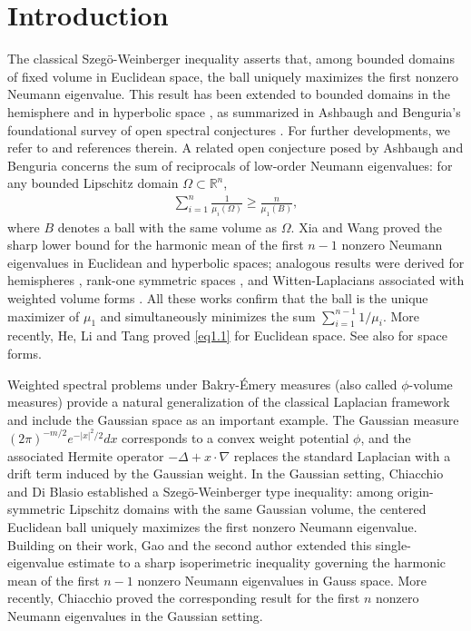 \documentclass[11pt,leqno]{amsart}
\numberwithin{equation}{section}
\begin{document}
\section{Introduction}
The classical Szeg\"o-Weinberger inequality \cite{Sz54, Wei56} asserts that, among bounded domains of fixed volume in Euclidean space, the ball uniquely maximizes the first nonzero Neumann eigenvalue. This result has been extended to bounded domains in the hemisphere and in hyperbolic space \cite{AB95}, as summarized in Ashbaugh and Benguria’s foundational survey of open spectral conjectures \cite{As99}. For further  developments, we refer to \cite{AS96, BCB16,  LL23, Wang19} and references therein. A  related open conjecture posed by Ashbaugh and Benguria \cite{AB93} concerns the sum of reciprocals of low-order Neumann eigenvalues: for any bounded Lipschitz domain $\Omega\subset\mathbb{R}^n$,
\begin{align}\label{eq1.1}
\sum_{i=1}^n \frac{1}{\mu_i(\Omega)} \ge \frac{n}{\mu_1(B)},
\end{align}
where $B$ denotes a ball with the same volume as $\Omega$.
Xia and Wang \cite{XW23}  proved the sharp lower bound for the harmonic mean of the first $n-1$ nonzero Neumann eigenvalues in Euclidean and hyperbolic spaces; analogous results were derived for hemispheres \cite{BBC20}, rank-one symmetric spaces \cite{MW24}, and Witten-Laplacians associated with weighted volume forms \cite{CM24}. All these works confirm that the ball is the unique maximizer of $\mu_1$ and simultaneously minimizes the sum $\sum_{i=1}^{n-1}1/\mu_i$. More recently, He, Li and Tang \cite{HLT26} proved \eqref{eq1.1} for Euclidean space. See also \cite{YZ26} for space forms. 

Weighted spectral problems under Bakry-\'Emery measures (also called $\phi$-volume measures) provide a natural generalization of the classical Laplacian framework and include the Gaussian space as an  important example. The Gaussian measure $(2\pi)^{-m/2}e^{-|x|^2/2}dx$ corresponds to a convex weight potential $\phi$, and the associated Hermite operator $-\Delta + x\cdot\nabla$ replaces the standard Laplacian with a drift term induced by the Gaussian weight.  In the Gaussian setting,  Chiacchio and Di Blasio \cite{CB12} established a Szeg\"o-Weinberger type inequality: among origin-symmetric Lipschitz domains with the same Gaussian volume, the centered Euclidean ball uniquely maximizes the first nonzero Neumann eigenvalue. Building on their work, Gao and the second author \cite{GW26} extended this single-eigenvalue estimate to a sharp isoperimetric inequality governing the harmonic mean of the first $n-1$ nonzero Neumann eigenvalues in Gauss space. More recently, Chiacchio  \cite{Fr26} proved the corresponding result for the first $n$ nonzero Neumann eigenvalues in the Gaussian setting.
\end{document}
